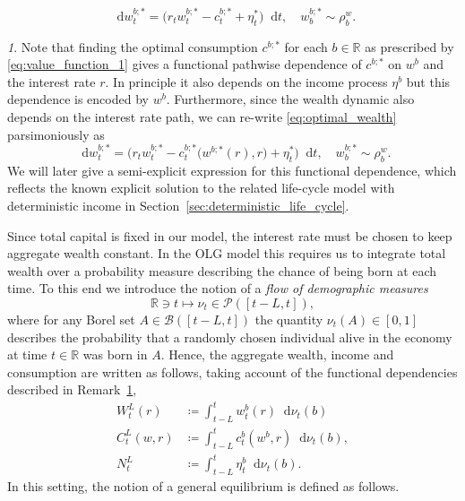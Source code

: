 \documentclass[11pt,oneside,english,reqno,dvipsnames,table]{amsart}
\numberwithin{equation}{section}
\theoremstyle{plain}
\theoremstyle{definition}
\theoremstyle{remark}
\newtheorem{rem}[thm]{\protect\remarkname}
\theoremstyle{plain}
\theoremstyle{plain}
\theoremstyle{plain}
\theoremstyle{plain}
\theoremstyle{plain}
\theoremstyle{plain}
\theoremstyle{plain}
\providecommand{\remarkname}{Remark}
\providecommand{\remarkname}{Remark}
\newcommand{\dd}{\mathop{}\!\mathrm{d}}
\newcommand{\mcB}{\mathcal{B}}
\newcommand{\mcP}{\mathcal{P}}
\newcommand{\mbR}{\mathbb{R}}
\numberwithin{thm}{section}
\begin{document}
\begin{equation}\label{eq:optimal_wealth}
    \dd w_t^{b;*} =\big(r_t w_t^{b;*}-c_t^{b;*}+\eta^*_t\big)\dd t,\quad w^{b;*}_b \sim \rho^w_b.
\end{equation}
%
\begin{rem}\label{rem:conumption_dependence}
    Note that finding the optimal consumption $c^{b;*}$ for each $b\in \mbR$ as prescribed by \eqref{eq:value_function_1} gives a functional pathwise dependence of $c^{b;*}$ on $w^{b}$ and the interest rate $r$. In principle it also depends on the income process $\eta^b$ but this dependence is encoded by $w^b$. Furthermore, since the wealth dynamic also depends on the interest rate path, we can re-write \eqref{eq:optimal_wealth} parsimoniously as
    \begin{equation}\label{eq:optimal_wealth_dependence}
    \dd w_t^{b;*} =\big(r_t w_t^{b;*}-c_t^{b;*}\big(w^{b;*}(r),r\big)+\eta^*_t\big)\dd t,\quad w^{b;*}_b \sim \rho^w_b.
\end{equation}
%
We will later give a semi-explicit expression for this functional dependence, which reflects the known explicit solution to the related life-cycle model with deterministic income in Section~\ref{sec:deterministic_life_cycle}.
\end{rem}

Since total capital is fixed in our model, the interest rate must be chosen to keep aggregate wealth constant. In the OLG model this requires us to integrate total wealth over a probability measure describing the chance of being born at each time. To this end we introduce the notion of a \emph{flow of demographic measures}
%
\begin{equation}
    \mbR \ni t \mapsto \nu_t \in \mcP([t-L,t]),
\end{equation}
%
where for any Borel set $A\in \mcB([t-L,t])$ the quantity $\nu_t(A) \in [0,1]$ describes the probability that a randomly chosen individual alive in the economy at time $t\in \mbR$ was born in $A$. Hence, the aggregate wealth, income and consumption are written as follows, taking account of the functional dependencies described in Remark~\ref{rem:conumption_dependence},
%
\begin{align}
    W^L_t(r) &\coloneqq \int_{t-L}^{t} w_t^{b}(r) \dd \nu_t(b)\label{eq:aggregate_wealth_intro}\\
    C^L_t(w,r) &\coloneqq \int_{t-L}^t c^{b}_t(w^b,r) \dd \nu_t(b) , \label{eq:aggregate_consumption_intro} \\
    N^L_t &\coloneqq \int_{t-L}^t \eta^{b}_t \dd \nu_t(b). \label{eq:aggregate_income_intro} 
\end{align}
%
In this setting, the notion of a general equilibrium is defined as follows.
\end{document}
